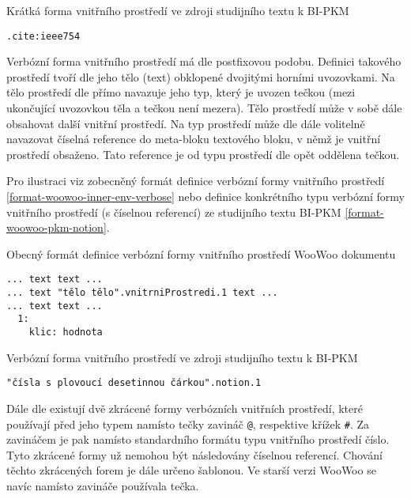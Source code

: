 \begin{listing}
    \caption{Krátká forma vnitřního prostředí ve zdroji studijního textu k BI-PKM \cite{pkm}}
    \label{format-woowoo-pkm-cite}
    \begin{verbatim}
.cite:ieee754
    \end{verbatim}
\end{listing}

Verbózní forma vnitřního prostředí má dle \cite{woowoo} postfixovou podobu. Definici takového prostředí tvoří dle
\cite{woowoo} jeho tělo (text) obklopené dvojitými horními uvozovkami. Na tělo prostředí dle \cite{woowoo} přímo
navazuje jeho typ, který je uvozen tečkou (mezi ukončující uvozovkou těla a tečkou není mezera). Tělo prostředí může
v sobě dále obsahovat další vnitřní prostředí. Na typ prostředí může dle \cite{woowoo} dále volitelně navazovat číselná
reference do meta-bloku textového bloku, v němž je vnitřní prostředí obsaženo. Tato reference je od typu prostředí dle
\cite{woowoo} opět oddělena tečkou.

Pro ilustraci viz zobecněný formát definice verbózní formy vnitřního prostředí \ref{format-woowoo-inner-env-verbose}
nebo definice konkrétního typu verbózní formy vnitřního prostředí (s číselnou referencí) ze studijního textu BI-PKM
\ref{format-woowoo-pkm-notion}.

\begin{listing}
    \caption{Obecný formát definice verbózní formy vnitřního prostředí WooWoo dokumentu}
    \label{format-woowoo-inner-env-verbose}
    \begin{verbatim}
... text text ...
... text "tělo tělo".vnitrniProstredi.1 text ...
... text text ...
  1:
    klic: hodnota
    \end{verbatim}
\end{listing}

\begin{listing}
    \caption{Verbózní forma vnitřního prostředí ve zdroji studijního textu k BI-PKM \cite{pkm}}
    \label{format-woowoo-pkm-notion}
    \begin{verbatim}
"čísla s plovoucí desetinnou čárkou".notion.1
    \end{verbatim}
\end{listing}

Dále dle \cite{woowoo} existují dvě zkrácené formy verbózních vnitřních prostředí, které používají před jeho typem
namísto tečky zavináč \texttt{@}, respektive křížek \texttt{#}. Za zavináčem je pak namísto
standardního formátu typu vnitřního prostředí číslo. Tyto zkrácené formy už nemohou být následovány číselnou
referencí. Chování těchto zkrácených forem je dále určeno šablonou. Ve starší verzi WooWoo se navíc namísto zavináče
používala tečka.

